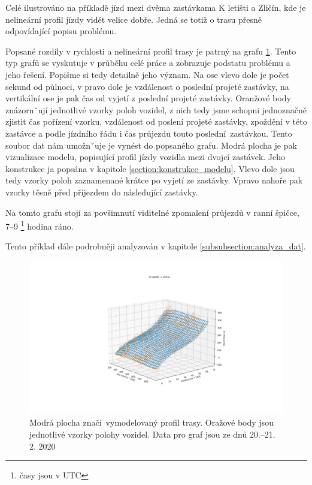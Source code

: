 Celé ilustrováno na příkladě jízd mezi dvěma zastávkama K letišti a Zličín, kde je nelineární profil jízdy vidět velice dobře. Jedná se totiž o trasu přesně odpovídající popisu problému.

\bigbreak

Popsané rozdíly v rychlosti a nelineární profil trasy je patrný na grafu \ref{fig:k_letisti_to_zlicin_3d}. Tento typ grafů se vyskutuje v průběhu celé práce a zobrazuje podstatu problému a jeho řešení. Popišme si tedy detailně jeho význam. Na ose vlevo dole je počet sekund od půlnoci, v pravo dole je vzdálenost o poslední projeté zastávky, na vertikální ose je pak čas od vyjetí z poslední projeté zastávky. Oranžové body znázornˇují jednotlivé vzorky poloh vozidel, z nich tedy jsme schopni jednoznačně zjistit čas pořízení vzorku, vzdálenost od poslení projeté zastávky, zpoždění v této zastávce a podle jízdního řádu i čas průjezdu touto poslední zastávkou. Tento soubor dat nám umožnˇuje je vynést do popsaného grafu. Modrá plocha je pak vizualizace modelu, popisující profil jízdy vozidla mezi dvojcí zastávek. Jeho konstrukce ja popsána v kapitole \ref{section:konstrukce_modelu}. Vlevo dole jsou tedy vzorky poloh zaznamenané krátce po vyjetí ze zastávky. Vpravo nahoře pak vzorky těsně před příjezdem do následující zastávky.

\bigbreak

Na tomto grafu stojí za povšimnutí viditelné zpomalení průjezdů v ranní špičce, 7--9 \footnote{časy jsou v UTC} hodina ráno.

\bigbreak

Tento příklad dále podrobněji analyzován v kapitole \ref{subsubsection:analyza_dat}.

\begin{figure}
  \includegraphics[width=\linewidth]{../img/k_letisti_to_zlicin_3d.png}
  \caption{Modrá plocha značí vymodelovaný profil trasy. Oražové body jsou jednotlivé vzorky polohy vozidel. Data pro graf jsou ze dnů 20.--21. 2. 2020}
  \label{fig:k_letisti_to_zlicin_3d}
\end{figure}

